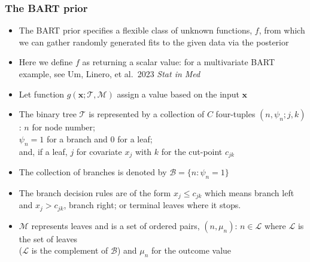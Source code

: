 \documentclass[11pt,dvipsnames,usenames,times]{beamer}
\begin{document}
\begin{frame}[fragile]
\frametitle{The BART prior}
\begin{itemize}
\item
The BART prior
specifies a flexible class of unknown functions, $f$, from which we
can gather randomly generated fits to the given data via the
posterior
\item Here we define $f$ as returning a scalar value: for 
a multivariate BART example, see Um, Linero, et al.\ 2023 {\it Stat in Med}
\item Let 
function $g(\bm{x}; \mathcal{T}, \mathcal{M})$ assign a value based on
the input $\bm{x}$
\item The binary tree $\mathcal{T}$ is represented by 
a collection of $C$ four-tuples
 $(n, \psi_n; j, k)$: $n$ for node number;\\ 
$\psi_n=1$ for a branch and 0 for a leaf;\\ 
and, if a leaf, $j$ for covariate $x_j$ 
with $k$ for the cut-point $c_{jk}$
\item The collection of branches is denoted by
 $\mathcal{B}=\{ n : \psi_n=1 \}$
\item The branch decision rules are of the form
$x_j\le c_{jk}$ which means branch left and $x_j>c_{jk}$, branch
right; or terminal leaves where it stops. 
\item  $\mathcal{M}$ represents
leaves and is a set of ordered pairs, $(n, \mu_n)$:
$n \in \mathcal{L}$ where $\mathcal{L}$ is the set of leaves\\
($\mathcal{L}$ is the complement of $\mathcal{B}$) and $\mu_n$ for the
outcome value
\end{itemize}

\end{frame}
\end{document}

